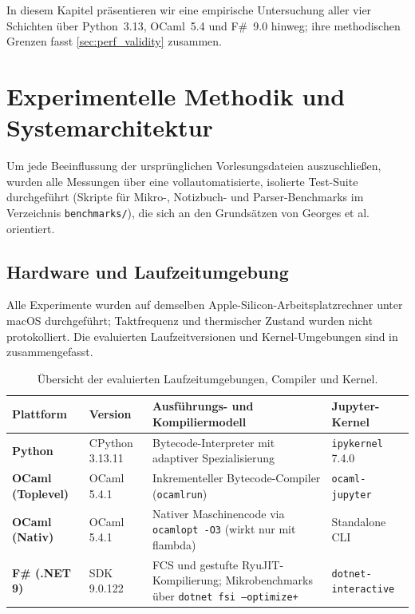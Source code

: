 In diesem Kapitel präsentieren wir eine empirische Untersuchung aller vier Schichten über Python~3.13, OCaml~5.4 und F\#~9.0 hinweg; ihre methodischen Grenzen fasst \cref{sec:perf_validity} zusammen.

\section{Experimentelle Methodik und Systemarchitektur}
\label{sec:perf_methodology}

Um jede Beeinflussung der ursprünglichen Vorlesungsdateien auszuschließen, wurden alle Messungen über eine vollautomatisierte, isolierte Test-Suite durchgeführt (Skripte für Mikro-, Notizbuch- und Parser-Benchmarks im Verzeichnis \texttt{benchmarks/}), die sich an den Grundsätzen von Georges et al.~\cite{georges2007statistically} orientiert.

\subsection{Hardware und Laufzeitumgebung}
Alle Experimente wurden auf demselben Apple-Silicon-Arbeitsplatzrechner unter macOS durchgeführt; Taktfrequenz und thermischer Zustand wurden nicht protokolliert.
Die evaluierten Laufzeitversionen und Kernel-Umgebungen sind in  zusammengefasst.

\begin{table}[htbp]
  \centering
  \small
  \caption{Übersicht der evaluierten Laufzeitumgebungen, Compiler und Kernel.}
  \label{tab:runtime_configurations}
  \begin{tabularx}{\textwidth}{llXl}
    \toprule
    \textbf{Plattform} & \textbf{Version} & \textbf{Ausführungs- und Kompiliermodell} & \textbf{Jupyter-Kernel} \\
    \midrule
    \textbf{Python} & CPython 3.13.11 & Bytecode-Interpreter mit adaptiver Spezialisierung & \texttt{ipykernel} 7.4.0 \\
    \addlinespace[3pt]
    \textbf{OCaml (Toplevel)} & OCaml 5.4.1 & Inkrementeller Bytecode-Compiler (\texttt{ocamlrun}) & \texttt{ocaml-jupyter} \\
    \addlinespace[3pt]
    \textbf{OCaml (Nativ)} & OCaml 5.4.1 & Nativer Maschinencode via \texttt{ocamlopt -O3} (wirkt nur mit flambda) & Standalone CLI \\
    \addlinespace[3pt]
    \textbf{F\# (.NET 9)} & SDK 9.0.122 & FCS und gestufte RyuJIT-Kompilierung; Mikrobenchmarks über \texttt{dotnet fsi --optimize+} & \texttt{dotnet-interactive} \\
    \bottomrule
  \end{tabularx}
\end{table}

